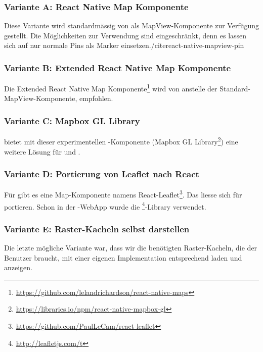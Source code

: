 \subsubsection{Variante A: React Native Map Komponente}
Diese Variante wird standardmässig von  als MapView-Komponente zur Verfügung gestellt. 
Die Möglichkeiten zur Verwendung sind eingeschränkt, denn es lassen sich auf  nur normale Pins als Marker einsetzen./cite{react-native-mapview-pin}


\subsubsection{Variante B: Extended React Native Map Komponente}
Die Extended React Native Map Komponente\footnote{\url{https://github.com/lelandrichardson/react-native-maps}} wird von  anstelle der Standard-MapView-Komponente, empfohlen.


\subsubsection{Variante C: Mapbox GL Library}
 bietet mit dieser experimentellen -Komponente (Mapbox GL Library\footnote{\url{https://libraries.io/npm/react-native-mapbox-gl}}) eine weitere Lösung für  und .


\subsubsection{Variante D: Portierung von Leaflet nach React}
Für  gibt es eine Map-Komponente namens React-Leaflet\footnote{\url{https://github.com/PaulLeCam/react-leaflet}}. 
Das liesse sich für  portieren.
Schon in der \kort{}-\gls{WebApp} wurde die \footnote{\url{http://leafletjs.com/t}}-Library verwendet.


\subsubsection{Variante E: Raster-Kacheln selbst darstellen}
Die letzte mögliche Variante war, dass wir die benötigten Raster-Kacheln, die der Benutzer braucht, mit einer eigenen Implementation entsprechend laden und anzeigen.

